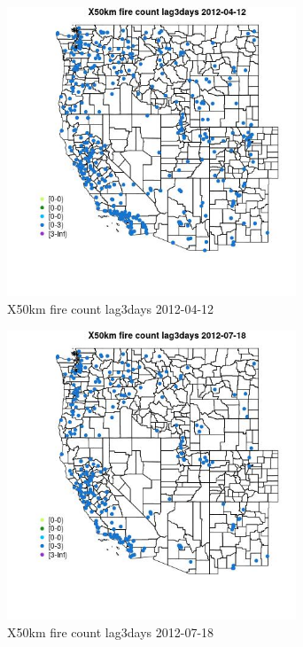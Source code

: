 \begin{figure} 
\centering  
\includegraphics[width=0.77\textwidth]{Code_Outputs/Report_ML_input_PM25_Step4_part_e_de_duplicated_aves_compiled_2019-05-14wNAs_MapObsX50km_fire_count_lag3days2012-04-12.jpg} 
\caption{\label{fig:Report_ML_input_PM25_Step4_part_e_de_duplicated_aves_compiled_2019-05-14wNAsMapObsX50km_fire_count_lag3days2012-04-12}X50km fire count lag3days 2012-04-12} 
\end{figure} 
 

\begin{figure} 
\centering  
\includegraphics[width=0.77\textwidth]{Code_Outputs/Report_ML_input_PM25_Step4_part_e_de_duplicated_aves_compiled_2019-05-14wNAs_MapObsX50km_fire_count_lag3days2012-07-18.jpg} 
\caption{\label{fig:Report_ML_input_PM25_Step4_part_e_de_duplicated_aves_compiled_2019-05-14wNAsMapObsX50km_fire_count_lag3days2012-07-18}X50km fire count lag3days 2012-07-18} 
\end{figure} 
 

